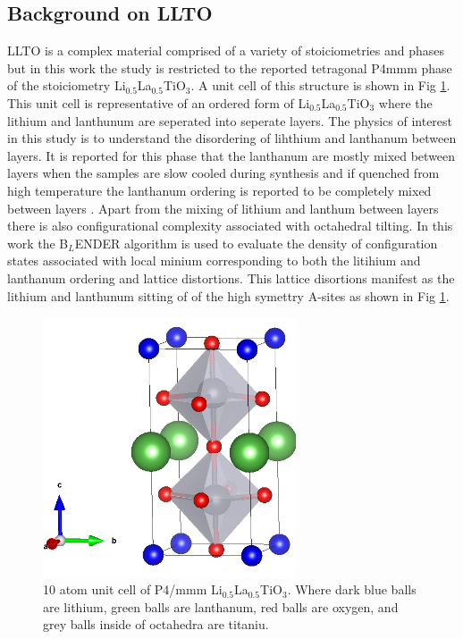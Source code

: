 \documentclass[aps,prl,reprint,superscriptaddress,showkeys]{revtex4-1}
\begin{document}
\subsection{Background on LLTO}
LLTO is a complex material comprised of a variety of stoiciometries and phases but in this work the study is restricted to the reported tetragonal P4mmm phase of the stoiciometry Li$_{0.5}$La$_{0.5}$TiO$_{3}$\cite{LLTOreview,P4mmmstrucuture}. A unit cell of this structure is shown in Fig \ref{LLTO_unit_cell}.  This unit cell is representative of an ordered form of Li$_{0.5}$La$_{0.5}$TiO$_{3}$ where the lithium and lanthunum are seperated into seperate layers. The physics of interest in this study is to understand the disordering of lihthium and lanthanum between layers.  It is reported for this phase that the lanthanum are mostly mixed between layers when the samples are slow cooled during synthesis and if quenched from high temperature the lanthanum ordering is reported to be completely mixed between layers \cite{P4mmmstrucuture}. Apart from the mixing of lithium and lanthum between layers there is also configurational complexity associated with octahedral tilting. In this work the B$_L$ENDER algorithm is used to evaluate the density of configuration states associated with local minium corresponding to both the litihium and lanthanum ordering and lattice distortions.  This lattice disortions manifest as the lithium and lanthunum sitting of of the high symettry A-sites as shown in Fig \ref{LLTO_unit_cell}.  
\begin{figure}
\includegraphics[width=7.5cm]{./figures/unit_cell_P4mmm_cropped.png}
\caption{10 atom unit cell of P4/mmm Li$_{0.5}$La$_{0.5}$TiO$_{3}$. Where dark blue balls are lithium, green balls are lanthanum, red balls are oxygen, and grey balls inside of octahedra are titaniu.\label{LLTO_unit_cell}}
\end{figure}
\end{document}
